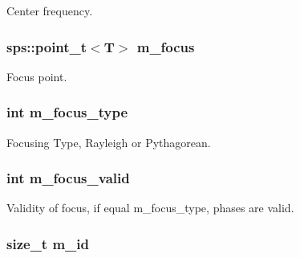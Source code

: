 Center frequency. 

\hypertarget{singletonfnm_1_1ApertureData_abbeae260606697441a45507f847876ef}{
\subsubsection[{m\+\_\+focus}]{\setlength{\rightskip}{0pt plus 5cm}sps\+::point\+\_\+t$<$T$>$ m\+\_\+focus}}\label{singletonfnm_1_1ApertureData_abbeae260606697441a45507f847876ef}


Focus point. 

\hypertarget{singletonfnm_1_1ApertureData_a6fed2f515d85db14127cadaa8ebe014b}{
\subsubsection[{m\+\_\+focus\+\_\+type}]{\setlength{\rightskip}{0pt plus 5cm}int m\+\_\+focus\+\_\+type}}\label{singletonfnm_1_1ApertureData_a6fed2f515d85db14127cadaa8ebe014b}


Focusing Type, Rayleigh or Pythagorean. 

\hypertarget{singletonfnm_1_1ApertureData_a93049b6e21b2069a9fe41469c3705cf4}{
\subsubsection[{m\+\_\+focus\+\_\+valid}]{\setlength{\rightskip}{0pt plus 5cm}int m\+\_\+focus\+\_\+valid}}\label{singletonfnm_1_1ApertureData_a93049b6e21b2069a9fe41469c3705cf4}


Validity of focus, if equal m\+\_\+focus\+\_\+type, phases are valid. 

\hypertarget{singletonfnm_1_1ApertureData_ad7c4acb1bca84f83f3072e0a9888818b}{
\subsubsection[{m\+\_\+id}]{\setlength{\rightskip}{0pt plus 5cm}size\+\_\+t m\+\_\+id}}\label{singletonfnm_1_1ApertureData_ad7c4acb1bca84f83f3072e0a9888818b}



